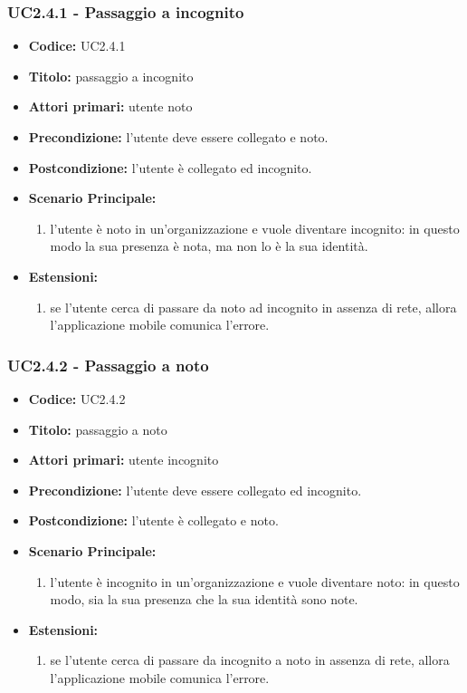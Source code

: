 \documentclass[casi-duso]{subfiles}
\begin{document}
\subsubsection{UC2.4.1 - Passaggio a incognito}
\label{subsub:uc2.4.1utente}
\begin{itemize}
  \item \textbf{Codice:} UC2.4.1
  \item \textbf{Titolo:} passaggio a incognito
  \item \textbf{Attori primari:} utente noto
  \item \textbf{Precondizione:} l'utente deve essere collegato e noto.
  \item \textbf{Postcondizione:} l'utente è collegato ed incognito.
  \item \textbf{Scenario Principale:}
  \begin{enumerate}
    \item l'utente è noto in un'organizzazione e vuole diventare incognito: in questo modo la sua presenza è nota, ma non lo è la sua identità.
  \end{enumerate}
  \item \textbf{Estensioni:} 
  \begin{enumerate}
    \item se l'utente cerca di passare da noto ad incognito in assenza di rete, allora l'applicazione mobile comunica l'errore.
  \end{enumerate}
\end{itemize}

\subsubsection{UC2.4.2 - Passaggio a noto}
\label{subsub:uc2.4.2utente}
\begin{itemize}
  \item \textbf{Codice:} UC2.4.2
  \item \textbf{Titolo:} passaggio a noto
  \item \textbf{Attori primari:} utente incognito
  \item \textbf{Precondizione:} l'utente deve essere collegato ed incognito.
  \item \textbf{Postcondizione:} l'utente è collegato e noto.
  \item \textbf{Scenario Principale:}
  \begin{enumerate}
    \item l'utente è incognito in un'organizzazione e vuole diventare noto: in questo modo, sia la sua presenza che la sua identità sono note.
  \end{enumerate}
  \item \textbf{Estensioni:} 
  \begin{enumerate}
    \item se l'utente cerca di passare da incognito a noto in assenza di rete, allora l'applicazione mobile comunica l'errore.
  \end{enumerate}
\end{itemize}
\end{document}
